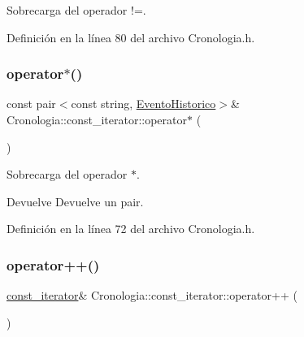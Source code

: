 Sobrecarga del operador !=. 



Definición en la línea 80 del archivo Cronologia.\+h.

\hypertarget{classCronologia_1_1const__iterator_a13c2b31e5d730e4ddab293200716bfb5}{}\label{classCronologia_1_1const__iterator_a13c2b31e5d730e4ddab293200716bfb5} 
\subsubsection{\texorpdfstring{operator$\ast$()}{operator*()}}
{\footnotesize\ttfamily const pair$<$const string, \hyperlink{classEventoHistorico}{Evento\+Historico}$>$\& Cronologia\+::const\+\_\+iterator\+::operator$\ast$ (\begin{DoxyParamCaption}{ }\end{DoxyParamCaption})\hspace{0.3cm}{\ttfamily [inline]}}



Sobrecarga del operador $\ast$. 

\begin{DoxyReturn}{Devuelve}
Devuelve un pair. 
\end{DoxyReturn}


Definición en la línea 72 del archivo Cronologia.\+h.

\hypertarget{classCronologia_1_1const__iterator_a7b821a0f25c98158f16e56d25d01699a}{}\label{classCronologia_1_1const__iterator_a7b821a0f25c98158f16e56d25d01699a} 
\subsubsection{\texorpdfstring{operator++()}{operator++()}}
{\footnotesize\ttfamily \hyperlink{classCronologia_1_1const__iterator}{const\+\_\+iterator}\& Cronologia\+::const\+\_\+iterator\+::operator++ (\begin{DoxyParamCaption}{ }\end{DoxyParamCaption})\hspace{0.3cm}{\ttfamily [inline]}}



